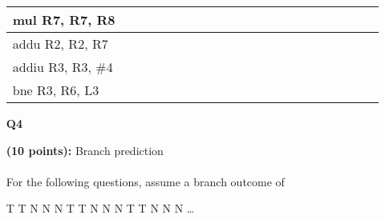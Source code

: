 \documentclass[a4paper,10pt]{article}
\begin{document}
\begin{enumerate}
{\begin{enumerate}
{\begin{table}[!hbpt]
\begin{tabular}{|l|c|c|c|c|c|c|c|c|c|c|c|c|c|c|c|c|c|l|l|l|}
mul R7, R7, R8      &                        &                        &                        &                        &                        &                        &                        &                        &                        &                         &                         &                         &                         &                         &                         &                         &                         &    &    &    \\ \hline
addu R2, R2, R7     &                        &                        &                        &                        &                        &                        &                        &                        &                        &                         &                         &                         &                         &                         &                         &                         &                         &    &    &    \\ \hline
addiu R3, R3, \#4   &                        &                        &                        &                        &                        &                        &                        &                        &                        &                         &                         &                         &                         &                         &                         &                         &                         &    &    &    \\ \hline
bne R3, R6, L3      &                        &                        &                        &                        &                        &                        &                        &                        &                        &                         &                         &                         &                         &                         &                         &                         &                         &    &    &    \\ \hline
\end{tabular}
\end{table}
            }
        \end{enumerate}
    }
    \item[\textbf{Q4}]{\textbf{(10 points):} Branch prediction \\ \\
        For the following questions, assume a branch outcome of
            \begin{center}
                T T N N N T T N N N T T N N N …

\end{center}}
\end{enumerate}
\end{document}
